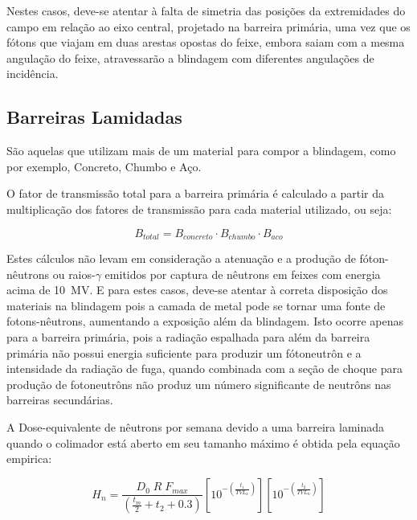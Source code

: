 \documentclass[11pt,a4paper]{article}
\newcounter{exemplo}
\begin{document}
                    Nestes casos, deve-se atentar à falta de simetria das posições da extremidades do campo em relação ao eixo central, projetado na barreira primária, uma vez que os fótons que viajam em duas arestas opostas do feixe, embora saiam com a mesma angulação do feixe, atravessarão a blindagem com diferentes angulações de incidência.  
            
        
        \subsection{Barreiras Lamidadas}
            
            São aquelas que utilizam mais de um material para compor a blindagem, como por exemplo, Concreto, Chumbo e Aço.

            O fator de transmissão total para a barreira primária é calculado a partir da multiplicação dos fatores de transmissão para cada material utilizado, ou seja:

            \begin{equation}
                B_{total} = B_{concreto} \cdot B_{chumbo} \cdot B_{aco}
            \end{equation}
            

            Estes cálculos não levam em consideração a atenuação e a produção de fóton-nêutrons ou raios-$\gamma$ emitidos por captura de nêutrons em feixes com energia acima de \qty{10}{MV}. E para estes casos, deve-se atentar à correta disposição dos materiais na blindagem pois a camada de metal pode se tornar uma fonte de fotons-nêutrons, aumentando a exposição além da blindagem. Isto ocorre apenas para a barreira primária, pois a radiação espalhada para além da barreira primária não possui energia suficiente para produzir um fótoneutrôn e a intensidade da radiação de fuga, quando combinada com a seção de choque para produção de fotoneutrôns não produz um número significante de neutrôns nas barreiras secundárias.

            A Dose-equivalente de nêutrons por semana devido a uma barreira laminada quando o colimador está aberto em seu tamanho máximo é obtida pela equação empirica:

            \begin{equation}
                H_n = \frac{D_0 \; R \; F_{max}}{\left(\frac{t_m}{2} + t_2 + 0.3\right)} 
                \left[10^{-\left(\frac{t_1}{TVL_x}\right)}\right]
                \left[10^{-\left(\frac{t_2}{TVL_n}\right)}\right]
            \end{equation}
\end{document}
